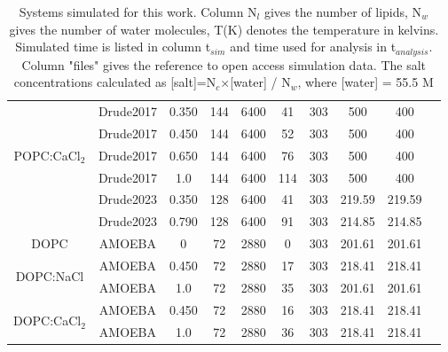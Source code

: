 \documentclass[journal=jacsat,manuscript=article,layout=singlecolumn]{achemso}
\begin{document}
\begin{table}[]
\begin{small}
\begin{tabular}{cccccccccc}
	\multirow{5}{*}{POPC:CaCl$_{2}$} & Drude2017 & 0.350   & 144      & 6400     & 41         & 303   & 500             & 400                  & \cite{kav_batuhan_2020_7600827}   \\
				  & Drude2017 & 0.450   & 144      & 6400     & 52         & 303   & 500             & 400                  & \cite{kav_batuhan_2020_7605016}   \\
				  & Drude2017 & 0.650   & 144      & 6400     & 76         & 303   & 500             & 400                  & \cite{kav_batuhan_2020_7604040} \\
				  & Drude2017 & 1.0   & 144      & 6400     & 114         & 303   & 500             & 400                  & \cite{kav_batuhan_2023_7658975}\\
                    & Drude2023 & 0.350 & 128      & 6400     & 41          & 303   & 219.59          & 219.59               & \cite{kav_batuhan_2023_8000065}\\
                    & Drude2023 & 0.790 & 128      & 6400     & 91          & 303   & 214.85          & 214.85               & \cite{kav_batuhan_2023_7992137} \\ \hline
DOPC           & AMOEBA   & 0 & 72 & 2880 & 0 & 303 & 201.61 & 201.61 & \cite{kav_batuhan_2022_7604681} \\ \hline
\multirow{2}{*}{DOPC:NaCl} & AMOEBA & 0.450 & 72 & 2880 & 17 & 303 & 218.41 & 218.41 & \cite{kav_batuhan_2022_7604711} \\
                           & AMOEBA & 1.0 & 72 & 2880 &  35 & 303 & 201.61 & 201.61 & \cite{kav_batuhan_2023_7625844} \\ \hline
\multirow{2}{*}{DOPC:CaCl$_{2}$} & AMOEBA  & 0.450 & 72 & 2880 & 16 & 303 & 218.41 & 218.41 & \cite{kav_batuhan_2022_7604842} \\
                                 & AMOEBA & 1.0 & 72 & 2880  & 36 & 303 & 218.41 & 218.41 & \cite{kav_batuhan_2022_7604810}
				  
\end{tabular}
\end{small}
\caption{Systems simulated for this work. Column N$_l$ gives the number of lipids, N$_w$ gives the number of water molecules, T(K) denotes the temperature in kelvins. Simulated time is listed in column t$_{sim}$ and time used for analysis in t$_{analysis}$. Column "files" gives the reference to open access simulation data. The salt concentrations calculated as [salt]=N$_c$×[water] / N$_w$, where [water] = 55.5 M}
\label{table:sim_details}
\end{table}
\end{document}
